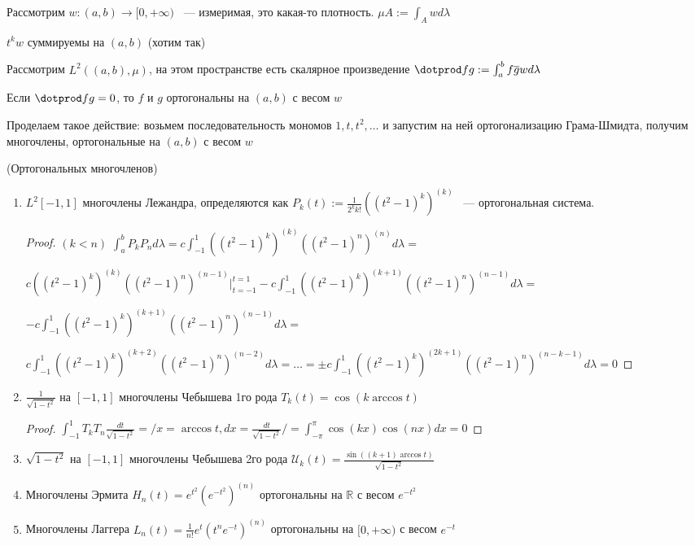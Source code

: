 Рассмотрим $w: (a, b) \rightarrow [0, +\infty)$ ~--- измеримая, это какая-то плотность.
 $\mu A := \int_A w d\lambda$
 
 $t^k w$ суммируемы на $(a,b)$ (хотим так)
 
 Рассмотрим $L^2((a, b), \mu)$, на этом пространстве есть скалярное произведение
 $\dotprod fg := \int_a^b f\overline{g} w d\lambda$
 
 Если $\dotprod fg = 0$, то $f$ и $g$ ортогональны на $(a, b)$ с весом $w$
 
 Проделаем такое действие: возьмем последовательность мономов $1, t, t^2, \ldots$ и запустим
  на ней ортогонализацию Грама-Шмидта, получим многочлены, ортогональные на $(a, b)$ с весом $w$
  
  \begin{examples} (Ортогональных многочленов)
  	\begin{enumerate}
		\item $L^2[-1, 1]$ многочлены Лежандра, определяются как $P_k(t) := \frac{1}{2^k k!}((t^2 - 1)^k)^{(k)}$ ~--- ортогональная система.
		
		\begin{proof}
		$(k < n)$ $\int_a^b P_k P_n d\lambda = c  \int_{-1}^1 ((t^2 - 1)^k)^{(k)}((t^2 - 1)^n)^{(n)} d\lambda
		=$
		
		$  c((t^2 - 1)^k)^{(k)}((t^2 - 1)^n)^{(n - 1)} \Big|_{t = -1}^{t = 1} -
		 c \int_{-1}^1 ((t^2 - 1)^k)^{(k + 1)}((t^2 - 1)^n)^{(n - 1)} d\lambda =$
		 
		 $ -
		 c \int_{-1}^1 ((t^2 - 1)^k)^{(k + 1)}((t^2 - 1)^n)^{(n - 1)} d\lambda =$
		 
		 $c \int_{-1}^1 ((t^2 - 1)^k)^{(k + 2)}((t^2 - 1)^n)^{(n - 2)} d\lambda = \ldots =
		 \pm c \int_{-1}^1 ((t^2 - 1)^k)^{(2k + 1)}((t^2 - 1)^n)^{(n - k - 1)} d\lambda= 0$
		 \end{proof}
		 
		 \item $\frac{1}{\sqrt{1 - t^2}}$ на $[-1, 1]$ многочлены Чебышева 1го рода 
		 $T_k(t) = \cos(k\arccos t)$
		 
		 \begin{proof}
		$\int_{-1}^1 T_k T_n \frac{dt}{\sqrt{1 - t^2}} =  / x = \arccos t, dx = \frac{dt}{\sqrt{1 - t^2}}/ =
		\int_{-\pi}^\pi \cos(kx)\cos(nx)dx = 0$
		
		 \end{proof}
		 
		  \item $\sqrt{1 - t^2}$ на $[-1, 1]$ многочлены Чебышева 2го рода 
		 $\mathcal{U}_k(t) = \frac{\sin((k+1)\arccos t)}{\sqrt{1-t^2}}$
		 
		 \item Многочлены Эрмита 
		 $H_n(t) = e^{t^2}(e^{-t^2})^{(n)}$ ортогональны на $\mathbb{R}$ с весом $e^{-t^2}$
		 
		 \item Многочлены Лаггера $L_n(t) = \frac{1}{n!}e^t(t^n e^{-t})^{(n)}$ ортогональны на
		 $[0, +\infty)$ с весом $e^{-t}$
	\end{enumerate}
  \end{examples}
  
